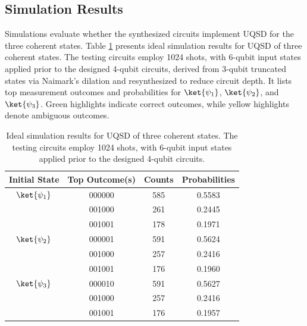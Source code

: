 \subsection{Simulation Results}
Simulations evaluate whether the synthesized circuits implement UQSD for the
three coherent states.
Table \ref{tab:ideal_sim} presents ideal simulation results for UQSD of three
coherent states.
The testing circuits employ 1024 shots, with 6-qubit input states applied prior
to the designed 4-qubit circuits, derived from 3-qubit truncated states via
Naimark’s dilation and resynthesized to reduce circuit depth.
It lists top measurement outcomes and probabilities for \(\ket{\psi_1}\),
\(\ket{\psi_2}\), and \(\ket{\psi_3}\).
Green highlights indicate correct outcomes, while yellow highlights denote
ambiguous outcomes.

\begin{table}[htbp]
    \centering
    \caption{
        Ideal simulation results for UQSD of three coherent states.
        The testing circuits employ 1024 shots, with 6-qubit input states
        applied prior to the designed 4-qubit circuits.
    }
    \label{tab:ideal_sim}
    \begin{tabular}{c|c|c|c}
        \textbf{Initial State} & \textbf{Top Outcome(s)}      & \textbf{Counts} & \textbf{Probabilities} \\
        \hline
        $\ket{\psi_1}$         & \cellcolor{green!20} 000000  & 585             & 0.5583                 \\
                               & \cellcolor{yellow!20} 001000 & 261             & 0.2445                 \\
                               & \cellcolor{yellow!20} 001001 & 178             & 0.1971                 \\
        \hline
        $\ket{\psi_2}$         & \cellcolor{green!20} 000001  & 591             & 0.5624                 \\
                               & \cellcolor{yellow!20} 001000 & 257             & 0.2416                 \\
                               & \cellcolor{yellow!20} 001001 & 176             & 0.1960                 \\
        \hline
        $\ket{\psi_3}$         & \cellcolor{green!20} 000010  & 591             & 0.5627                 \\
                               & \cellcolor{yellow!20} 001000 & 257             & 0.2416                 \\
                               & \cellcolor{yellow!20} 001001 & 176             & 0.1957                 \\
    \end{tabular}
\end{table}

